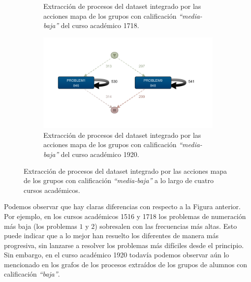 \begin{figure}[H]
\begin{subfigure}[t]{0.60\textwidth}
    \caption{Extracción de procesos del dataset integrado por las acciones mapa de los grupos con calificación \emph{``media-baja''} del curso académico 1718.}
    \label{fig:mapYear1718MidLowGrades}
  \end{subfigure}
  \hfill
  \begin{subfigure}[t]{0.60\textwidth}
    \includegraphics[width=1.10\textwidth, height=0.80\textwidth]{imagenes/DISCO_map/Dataset FusionadoYear1920MidLowGrades.png}
    \caption{Extracción de procesos del dataset integrado por las acciones mapa de los grupos con calificación \emph{``media-baja''} del curso académico 1920.}
    \label{fig:mapYear1920MidLowGrades}
  \end{subfigure}
  \caption{Extracción de procesos del dataset integrado por las acciones mapa de los grupos con calificación \emph{``media-baja''} a lo largo de cuatro cursos académicos.}
\end{figure}

Podemos observar que hay claras diferencias con respecto a la Figura anterior. Por ejemplo, en los cursos académicos 1516 y 1718 los problemas de numeración más baja (los problemas $1$ y $2$) sobresalen con las frecuencias más altas. Esto puede indicar que a lo mejor han resuelto los diferentes de manera más progresiva, sin lanzarse a resolver los problemas más difíciles desde el principio. Sin embargo, en el curso académico 1920 todavía podemos observar aún lo mencionado en los grafos de los procesos extraídos de los grupos de alumnos con calificación \emph{``baja''}.

